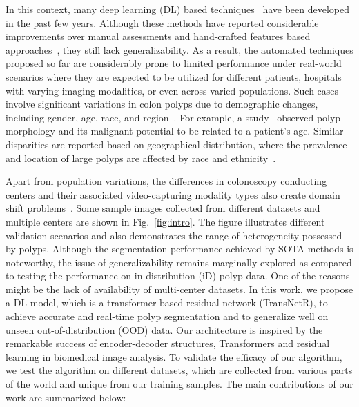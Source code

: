 \documentclass{midl} \usepackage{mwe}
\begin{document}
In this context, many deep learning (DL) based techniques~\cite{akbari2018polyp, duc2022colonformer} have been developed in the past few years. Although these methods have reported considerable improvements over manual assessments and hand-crafted features based approaches~\cite{bernal2015wm, tajbakhsh2015automated}, they still lack generalizability. As a result, the automated techniques proposed so far are considerably prone to limited performance under real-world scenarios where they are expected to be utilized for different patients, hospitals with varying imaging modalities, or even across varied populations. Such cases involve significant variations in colon polyps due to demographic changes, including gender, age, race, and region~\cite{yang2020colon}. For example, a study~\cite{cekodhima2016demographic} observed polyp morphology and its malignant potential to be related to a patient's age. Similar disparities are reported based on geographical distribution, where the prevalence and location of large polyps are affected by race and ethnicity~\cite{lieberman2014race}. 


Apart from population variations, the differences in colonoscopy conducting centers and their associated video-capturing modality types also create domain shift problems~\cite{chen2021beyond}. Some sample images collected from different datasets and multiple centers are shown in Fig.~\ref{fig:intro}. The figure illustrates different validation scenarios and also demonstrates the range of heterogeneity possessed by polyps.  Although the segmentation performance achieved by SOTA methods is noteworthy, the issue of generalizability remains marginally explored as compared to testing the performance on in-distribution (iD) polyp data. One of the reasons might be the lack of availability of multi-center datasets.  In this work, we propose a DL model, which is a transformer based residual network (TransNetR), to achieve accurate and real-time polyp segmentation and to generalize well on unseen out-of-distribution (OOD) data. Our architecture is inspired by the remarkable success of encoder-decoder structures, Transformers and residual learning in biomedical image analysis. To validate the efficacy of our algorithm, we test the algorithm on different datasets, which are collected from various parts of the world and unique from our training samples. The main contributions of our work are summarized below:
\end{document}
